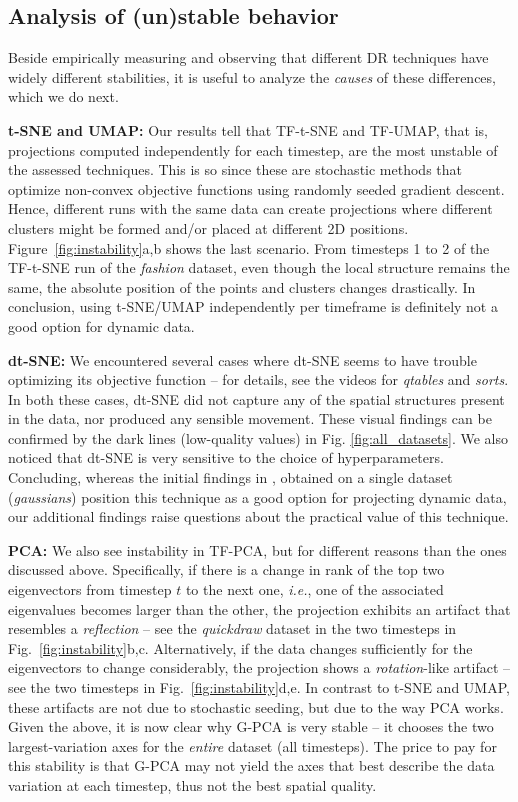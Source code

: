 \subsection{Analysis of (un)stable behavior}
\label{sec:unstable}
%
Beside empirically measuring and observing that different DR techniques have widely different stabilities, it is useful to analyze the \emph{causes} of these differences, which we do next.

\noindent\textbf{t-SNE and UMAP:} Our results tell that TF-t-SNE and TF-UMAP, that is, projections computed independently for each timestep, are the most unstable of the assessed techniques.
This is so since these are stochastic methods that optimize non-convex objective functions using randomly seeded gradient descent. Hence, different runs with the same data can create projections where different clusters might be formed and/or placed at different 2D positions. Figure~\ref{fig:instability}a,b shows the last scenario. From timesteps 1 to 2 of the TF-t-SNE run of the \textit{fashion} dataset, even though the local structure remains the same, the absolute position of the points and clusters changes drastically. In conclusion, using t-SNE/UMAP independently per timeframe is definitely not a good option for dynamic data.

\noindent\textbf{dt-SNE:} We encountered several cases where dt-SNE seems to have trouble optimizing its objective function -- for details, see the videos for \textit{qtables} and \textit{sorts}. In both these cases, dt-SNE did not capture any of the spatial structures present in the data, nor produced any sensible movement. These visual findings can be confirmed by the dark lines (low-quality values) in Fig. \ref{fig:all_datasets}. We also noticed that dt-SNE is very sensitive to the choice of hyperparameters. Concluding, whereas the initial findings in \cite{Rauber2016}, obtained on a single dataset (\emph{gaussians}) position this technique as a good option for projecting dynamic data, our additional findings raise questions about the practical value of this technique.

\noindent\textbf{PCA:} We also see instability in TF-PCA, but for different reasons than the ones discussed above. Specifically, if there is a change in rank of the top two eigenvectors from timestep $t$ to the next one, \emph{i.e.}, one of the associated eigenvalues becomes larger than the other, the projection exhibits an artifact that resembles a \emph{reflection} -- see the \emph{quickdraw} dataset in the two timesteps in Fig.~\ref{fig:instability}b,c. Alternatively, if the data changes sufficiently for the eigenvectors to change considerably, the projection shows a \emph{rotation}-like artifact -- see the two timesteps in Fig.~\ref{fig:instability}d,e. In contrast to t-SNE and UMAP, these artifacts are not due to stochastic seeding, but due to the way PCA works. Given the above, it is now clear why G-PCA is very stable -- it chooses the two largest-variation axes for the \emph{entire} dataset (all timesteps). The price to pay for this stability is that G-PCA may not yield the axes that best describe the data variation at each timestep, thus not the best spatial quality.

